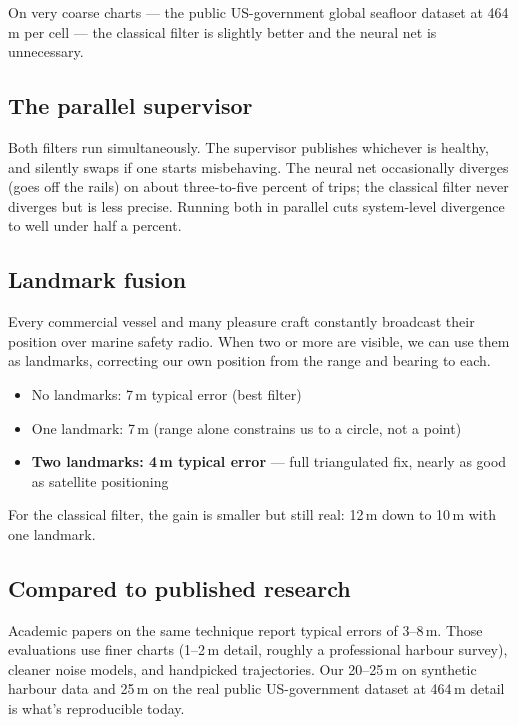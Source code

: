 \documentclass[10pt,a4paper]{article}
\begin{document}
On very coarse charts --- the public US-government global seafloor
dataset at 464\,m per cell --- the classical filter is slightly better
and the neural net is unnecessary.

\subsection{The parallel supervisor}

Both filters run simultaneously. The supervisor publishes whichever is
healthy, and silently swaps if one starts misbehaving. The neural net
occasionally diverges (goes off the rails) on about three-to-five
percent of trips; the classical filter never diverges but is less
precise. Running both in parallel cuts system-level divergence to
well under half a percent.

\subsection{Landmark fusion}

Every commercial vessel and many pleasure craft constantly broadcast
their position over marine safety radio. When two or more are
visible, we can use them as landmarks, correcting our own position
from the range and bearing to each.

\begin{itemize}
\item No landmarks: 7\,m typical error (best filter)
\item One landmark: 7\,m (range alone constrains us to a circle, not a point)
\item \textbf{Two landmarks: 4\,m typical error} --- full triangulated fix, nearly as good as satellite positioning
\end{itemize}

For the classical filter, the gain is smaller but still real: 12\,m
down to 10\,m with one landmark.

\subsection{Compared to published research}

Academic papers on the same technique report typical errors of
3--8\,m. Those evaluations use finer charts (1--2\,m detail, roughly
a professional harbour survey), cleaner noise models, and handpicked
trajectories. Our 20--25\,m on synthetic harbour data and 25\,m on
the real public US-government dataset at 464\,m detail is what's
reproducible today.
\end{document}
